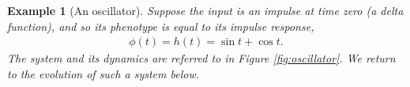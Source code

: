 \documentclass{article}
\newcommand{\1}{\mathbbm{1}}
\newtheorem{example}{Example}
\begin{document}
\begin{example}[An oscillator]
Suppose the input is an impulse at time zero (a delta function), and so its phenotype is equal to its impulse response,
\begin{align*}
\phi(t) = h(t) = \sin t + \cos t  .
\end{align*}
The system and its dynamics are referred to in Figure \ref{fig:oscillator}. We return to the evolution of such a system below.   
\end{example}
\end{document}
